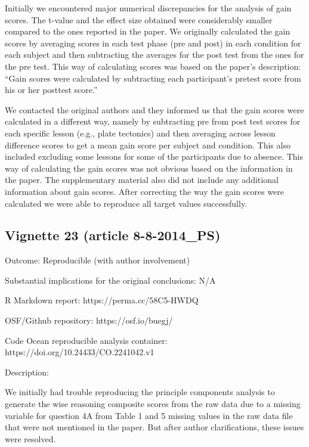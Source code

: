 \begin{appendix}
Initially we encountered major numerical discrepancies for the analysis
of gain scores. The t-value and the effect size obtained were
considerably smaller compared to the ones reported in the paper. We
originally calculated the gain scores by averaging scores in each test
phase (pre and post) in each condition for each subject and then
subtracting the averages for the post test from the ones for the pre
test. This way of calculating scores was based on the paper's
description: ``Gain scores were calculated by subtracting each
participant's pretest score from his or her posttest score.''

We contacted the original authors and they informed us that the gain
scores were calculated in a different way, namely by subtracting pre
from post test scores for each specific lesson (e.g., plate tectonics)
and then averaging across lesson difference scores to get a mean gain
score per subject and condition. This also included excluding some
lessons for some of the participants due to absence. This way of
calculating the gain scores was not obvious based on the information in
the paper. The supplementary material also did not include any
additional information about gain scores. After correcting the way the
gain scores were calculated we were able to reproduce all target values
successfully.

\hypertarget{vignette-23-article-8-8-2014_ps}{%
\subsection{Vignette 23 (article
8-8-2014\_PS)}\label{vignette-23-article-8-8-2014_ps}}

Outcome: Reproducible (with author involvement)

Substantial implications for the original conclusions: N/A

R Markdown report: https://perma.cc/58C5-HWDQ

OSF/Github repository: https://osf.io/buegj/

Code Ocean reproducible analysis container:
https://doi.org/10.24433/CO.2241042.v1

Description:

We initially had trouble reproducing the principle components analysis
to generate the wise reasoning composite scores from the raw data due to
a missing variable for question 4A from Table 1 and 5 missing values in
the raw data file that were not mentioned in the paper. But after author
clarifications, these issues were resolved.


\end{appendix}
